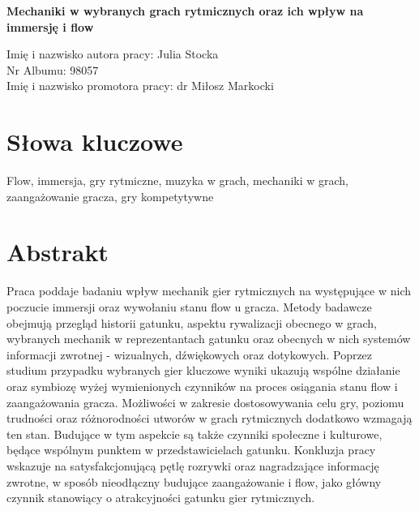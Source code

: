 \begin{center}
   \textbf{\large Mechaniki w wybranych grach rytmicznych oraz ich wpływ na immersję i flow}
\end{center}
Imię i nazwisko autora pracy: Julia Stocka \\
Nr Albumu: 98057 \\
Imię i nazwisko promotora pracy: dr Miłosz Markocki

\section*{Słowa kluczowe}
\noindent
Flow, immersja, gry rytmiczne, muzyka w grach, mechaniki w grach, zaangażowanie gracza, gry kompetytywne

\section*{Abstrakt}
Praca poddaje badaniu wpływ mechanik gier rytmicznych na występujące w nich poczucie immersji oraz wywołaniu stanu flow u gracza. Metody badawcze obejmują przegląd historii gatunku, aspektu rywalizacji obecnego w grach, wybranych mechanik w reprezentantach gatunku oraz obecnych w nich systemów informacji zwrotnej - wizualnych, dźwiękowych oraz dotykowych. Poprzez studium przypadku wybranych gier kluczowe wyniki ukazują wspólne działanie oraz symbiozę wyżej wymienionych czynników na proces osiągania stanu flow i zaangażowania gracza. Możliwości w zakresie dostosowywania celu gry, poziomu trudności oraz różnorodności utworów w grach rytmicznych dodatkowo wzmagają ten stan. Budujące w tym aspekcie są także czynniki społeczne i kulturowe, będące wspólnym punktem w przedstawicielach gatunku. Konkluzja pracy wskazuje na satysfakcjonującą pętlę rozrywki oraz nagradzające informację zwrotne, w sposób nieodłączny budujące zaangażowanie i flow, jako główny czynnik stanowiący o atrakcyjności gatunku gier rytmicznych.